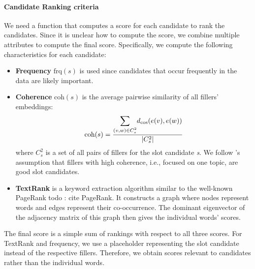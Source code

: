 \paragraph{Candidate Ranking criteria}
We need a function that computes a score for each candidate to rank the candidates.
Since it is unclear how to compute the score, we combine multiple attributes to compute the final score.
Specifically, we compute the following characteristics for each candidate:
\begin{itemize}
    \item \textbf{Frequency} $\text{frq}(s)$ is used since candidates that occur frequently in the data are likely important.
    
    \item \textbf{Coherence} $\text{coh}(s)$ is the average pairwise similarity of all fillers' embeddings:
    \begin{equation}
        \text{coh}(s) = \frac{\mathlarger{\sum}_{(v,w) \in C^2_s}{d_{\cos}(e(v), e(w))}}{|C^2_s|}
    \end{equation}
    where $C^2_s$ is a set of all pairs of fillers for the slot candidate \emph{s}.
    We follow \citet{chen2014leveraging}'s assumption that fillers with high coherence, i.e., focused on one topic, are good slot candidates.
    
    \item \textbf{TextRank} \cite{mihalcea2004textrank} is a keyword extraction algorithm similar to the well-known PageRank todo : cite PageRank.
    It constructs a graph where nodes represent words and edges represent their co-occurrence.
    The dominant eigenvector of the adjacency matrix of this graph then gives the individual words' scores.
\end{itemize}
The final score is a simple sum of rankings with respect to all three scores.
For TextRank and frequency, we use a placeholder representing the slot candidate instead of the respective fillers.
Therefore, we obtain scores relevant to candidates rather than the individual words.

